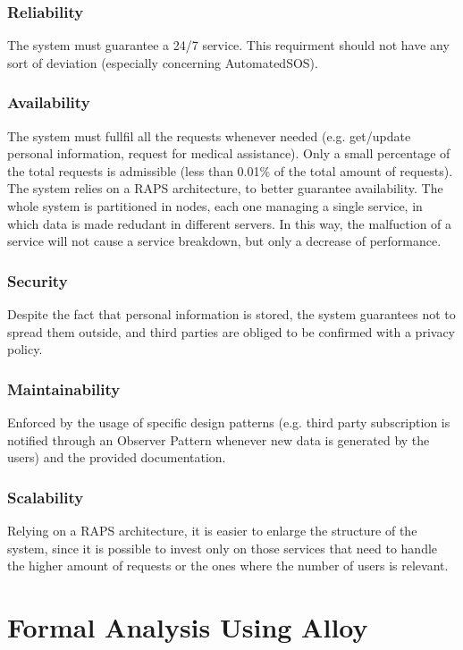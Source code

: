 \documentclass[12pt,a4paper]{article}
\begin{document}
		\subsubsection{Reliability}
		The system must guarantee a 24/7 service. This requirment should not have any sort of deviation (especially concerning AutomatedSOS).
		\subsubsection{Availability}
		The system must fullfil all the requests whenever needed (e.g. get/update personal information, request for medical assistance). Only a small percentage of the total requests is admissible (less than 0.01\% of the total amount of requests). The system relies on a RAPS architecture, to better guarantee availability. The whole system is partitioned in nodes, each one managing a single service, in which data is made redudant in different servers. In this way, the malfuction of a service will not cause a service breakdown, but only a decrease of performance.
		\subsubsection{Security}
		Despite the fact that personal information is stored, the system guarantees not to spread them outside, and third parties are obliged to be confirmed with a privacy policy.
		\subsubsection{Maintainability}
		Enforced by the usage of specific design patterns (e.g. third party subscription is notified through an Observer Pattern whenever new data is generated by the users) and the provided documentation.
		\subsubsection{Scalability}
		Relying on a RAPS architecture, it is easier to enlarge the structure of the system, since it is possible to invest only on those services that need to handle the higher amount of requests or the ones where the number of users is relevant.
	
	
	\newpage
	\section{Formal Analysis Using Alloy}
	
	\newpage
	
\end{document}
